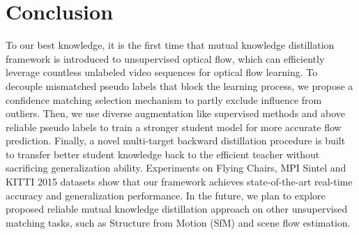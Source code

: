 \documentclass[lettersize,journal]{IEEEtran}
\begin{document}
\section{Conclusion}
To our best knowledge, it is the first time that mutual knowledge distillation framework is introduced to unsupervised optical flow, which can efficiently leverage countless unlabeled video sequences for optical flow learning. To decouple mismatched pseudo labels that block the learning process, we propose a confidence matching selection mechanism to partly exclude influence from outliers. Then, we use diverse augmentation like supervised methods and above reliable pseudo labels to train a stronger student model for more accurate flow prediction. Finally, a novel multi-target backward distillation procedure is built to transfer better student knowledge back to the efficient teacher without sacrificing generalization ability. Experiments on Flying Chairs, MPI Sintel and KITTI 2015 datasets show that our framework achieves state-of-the-art real-time accuracy and generalization performance. In the future, we plan to explore proposed reliable mutual knowledge distillation approach on other unsupervised matching tasks, such as Structure from Motion (SfM) and scene flow estimation.





\vfill
\end{document}
